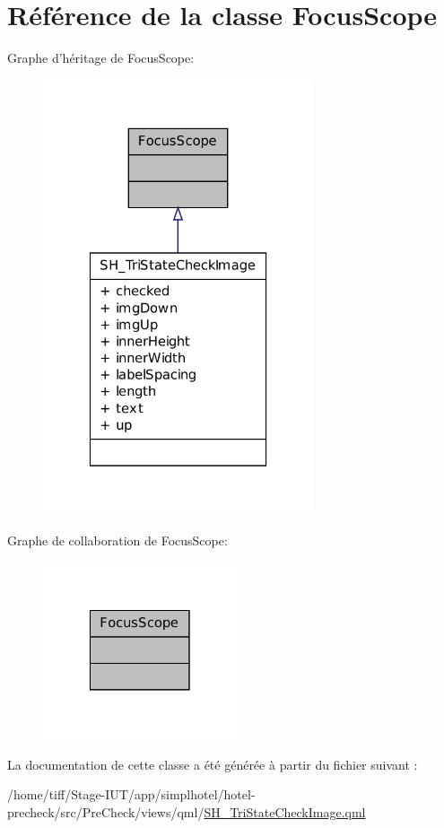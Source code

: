 \hypertarget{classFocusScope}{\section{Référence de la classe Focus\-Scope}
\label{classFocusScope}
}


Graphe d'héritage de Focus\-Scope\-:\nopagebreak
\begin{figure}[H]
\begin{center}
\leavevmode
\includegraphics[width=226pt]{classFocusScope__inherit__graph}
\end{center}
\end{figure}


Graphe de collaboration de Focus\-Scope\-:\nopagebreak
\begin{figure}[H]
\begin{center}
\leavevmode
\includegraphics[width=162pt]{classFocusScope__coll__graph}
\end{center}
\end{figure}


La documentation de cette classe a été générée à partir du fichier suivant \-:\begin{DoxyCompactItemize}
\item 
/home/tiff/\-Stage-\/\-I\-U\-T/app/simplhotel/hotel-\/precheck/src/\-Pre\-Check/views/qml/\hyperlink{SH__TriStateCheckImage_8qml}{S\-H\-\_\-\-Tri\-State\-Check\-Image.\-qml}\end{DoxyCompactItemize}
